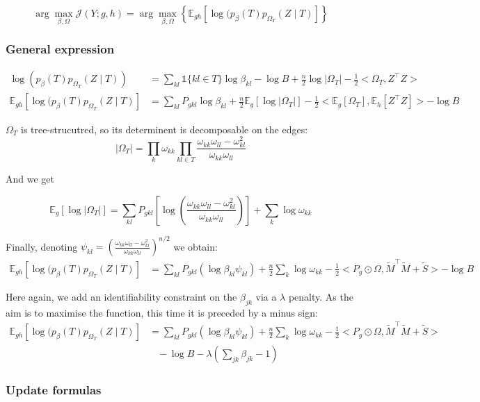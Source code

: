\documentclass[11pt,a4paper]{article}
\newcommand{\argmax}{\arg\!\max}
\newcommand{\Esp}{\mathds{E}}
\begin{document}
$$ \argmax_{\beta, \Omega} \mathcal{J}(Y ; g,h) =\argmax_{\beta, \Omega} \left\{ \Esp_{gh} [\log (p_\beta(T)p_{\Omega_T}(Z\mid T) ]\right\} $$

\subsubsection{General expression}
\begin{align*}
\log (p_\beta(T)p_{\Omega_T}(Z\mid T))  &= \sum_{kl} \mathds{1}\{kl \in T\} \log \beta_{kl} - \log B + \frac{n}{2}\log |\Omega_T| - \frac{1}{2}<\Omega_T,Z^\intercal Z>\\
\Esp_{gh} [\log (p_\beta(T)p_{\Omega_T}(Z\mid T) ] &= \sum_{kl} P_{gkl} \log\beta_{kl} +\frac{n}{2} \Esp_g[\log |\Omega_T|] -\frac{1}{2} <\Esp_g [\Omega_T], \Esp_h[Z^\intercal Z]>- \log B
\end{align*}

$\Omega_T$ is tree-strucutred, so its determinent is decomposable on the edges:
$$|\Omega_{T}| = \prod_{k} \omega_{kk} \prod_{kl \in T} \frac{\omega_{kk}\omega_{ll}-\omega_{kl}^2}{\omega_{kk}\omega_{ll}}$$

And we get

$$\Esp_g[\log |\Omega_{T}|]= \sum _{kl} P_{gkl} \left[ \log\left(\frac{\omega_{kk}\omega_{ll}-\omega_{kl}^2}{\omega_{kk}\omega_{ll}}\right)\right] + \sum_k \log \omega_{kk}$$

Finally, denoting $\psi_{kl} = \left(\frac{\omega_{kk}\omega_{ll}-\omega_{kl}^2}{\omega_{kk}\omega_{ll}}\right)^{n/2}$ we obtain:
\begin{align*}
\Esp_{gh} [\log (p_\beta(T)p_{\Omega_T}(Z\mid T) ] &=\sum_{kl} P_{gkl} \left(\log  \beta_{kl}\psi_{kl}\right) + \frac{n}{2}\sum_k \log \omega_{kk} - \frac{1}{2}<P_g \odot \Omega, \widetilde{M}^\intercal \widetilde{M} + \widetilde{S}>- \log B
\end{align*}

Here again, we add an identifiability constraint on the $\beta_{jk}$ via a $\lambda$ penalty. As the aim is to maximise the function, this time it is preceded by a minus sign:
\begin{align*}
\Esp_{gh} [\log (p_\beta(T)p_{\Omega_T}(Z\mid T) ] &=\sum_{kl} P_{gkl} \left(\log  \beta_{kl}\psi_{kl}\right) + \frac{n}{2}\sum_k \log \omega_{kk} - \frac{1}{2}<P_g \odot \Omega, \widetilde{M}^\intercal \widetilde{M} + \widetilde{S}>\\
& \;\;\;- \log B - \lambda(\sum_{jk} \beta_{jk} - 1 )
\end{align*}
\subsubsection{Update formulas}
\end{document}
